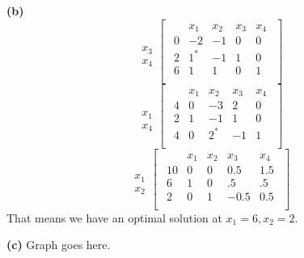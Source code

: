 \documentclass[12pt]{article}
\newenvironment{problem}[2][Problem]{\begin{trivlist}
\item[\hskip \labelsep {\bfseries #1}\hskip \labelsep {\bfseries #2.}]}{\end{trivlist}}
\newenvironment{subproblem}[1]{\textbf{(#1)}}{}
\theoremstyle{definition}
\begin{document}
\begin{problem}{3.12}
\begin{subproblem}{b}
\begin{equation}
\begin{array}{c}
\\
  \\
x_3 \\
x_4
\end{array}
\begin{bmatrix}
\begin{array}{c|cccc}
    & x_1 & x_2 & x_3 & x_4 \\ \hline
  0 & -2 & -1 & 0 & 0 \\ \hline
  2 & 1^* & -1 & 1 & 0  \\
  6 & 1 & 1 & 0 & 1 \\
\end{array}
\end{bmatrix}
\end{equation}
$ $ \\
\begin{equation}
\begin{array}{c}
\\
  \\
x_1 \\
x_4
\end{array}
\begin{bmatrix}
\begin{array}{c|cccc}
    & x_1 & x_2 & x_3 & x_4 \\ \hline
  4 & 0 & -3 & 2 & 0 \\ \hline
  2 & 1 & -1 & 1 & 0  \\
  4 & 0 & 2^* & -1 & 1 \\
\end{array}
\end{bmatrix}
\end{equation}
$ $ \\
\begin{equation}
\begin{array}{c}
\\
  \\
x_1 \\
x_2
\end{array}
\begin{bmatrix}
\begin{array}{c|cccc}
    & x_1 & x_2 & x_3 & x_4 \\ \hline
  10 & 0 & 0 & 0.5 & 1.5 \\ \hline
  6 & 1 & 0 & .5 & .5  \\
  2 & 0 & 1 & -0.5 & 0.5 \\
\end{array}
\end{bmatrix}
\end{equation}
That means we have an optimal solution at $x_1=6, x_2=2$.

\end{subproblem}

\begin{subproblem}{c}
Graph goes here.
\end{subproblem}


\end{problem}
\end{document}

